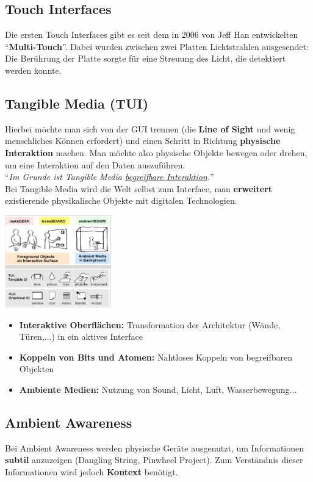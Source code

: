 \documentclass[a4paper]{article}
\begin{document}
\subsection{Touch Interfaces}
Die ersten Touch Interfaces gibt es seit dem in 2006 von Jeff Han entwickelten ``\textbf{Multi-Touch}''. Dabei wurden zwischen zwei Platten Lichtstrahlen ausgesendet: Die Berührung der Platte sorgte für eine Streuung des Licht, die detektiert werden konnte.

\subsection{Tangible Media (TUI)}
Hierbei möchte man sich von der GUI trennen (die \textbf{Line of Sight} und wenig menschliches Können erfordert) und einen Schritt in Richtung \textbf{physische Interaktion} machen. Man möchte also physische Objekte bewegen oder drehen, um eine Interaktion auf den Daten auszuführen. \\

``\textit{Im Grunde ist Tangible Media \underline{begreifbare Interaktion}.}''\\

Bei Tangible Media wird die Welt selbst zum Interface, man \textbf{erweitert} existierende physikalische Objekte mit digitalen Technologien.
\begin{center}
	\includegraphics[height = 4cm]{TUI.png}
\end{center}
\begin{itemize}
	\item \textbf{Interaktive Oberflächen:} Transformation der Architektur (Wände, Türen,...) in ein aktives Interface
	\item \textbf{Koppeln von Bits und Atomen:} Nahtloses Koppeln von begreifbaren Objekten
	\item \textbf{Ambiente Medien:} Nutzung von Sound, Licht, Luft, Wasserbewegung...
\end{itemize}
\subsection{Ambient Awareness}
Bei Ambient Awareness werden physische Geräte ausgenutzt, um Informationen \textbf{subtil} anzuzeigen (Dangling String, Pinwheel Project). Zum Verständnis dieser Informationen wird jedoch \textbf{Kontext} benötigt.
\end{document}
